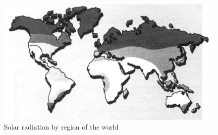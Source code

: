 \begin{figure}[H]
	\centering
	\includegraphics[scale=0.6]{./image/World_Solar_Radiation.jpg}
	\caption{Solar radiation by region of the world \cite{book_2}}
\end{figure}
\newpage

